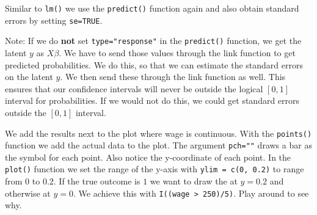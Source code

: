 \documentclass[]{article}
\newenvironment{Shaded}{\begin{snugshade}}{\end{snugshade}}
\newcommand{\CommentTok}[1]{\textcolor[rgb]{0.56,0.35,0.01}{\textit{#1}}}
\newcommand{\DataTypeTok}[1]{\textcolor[rgb]{0.13,0.29,0.53}{#1}}
\newcommand{\DecValTok}[1]{\textcolor[rgb]{0.00,0.00,0.81}{#1}}
\newcommand{\KeywordTok}[1]{\textcolor[rgb]{0.13,0.29,0.53}{\textbf{#1}}}
\newcommand{\NormalTok}[1]{#1}
\newcommand{\OperatorTok}[1]{\textcolor[rgb]{0.81,0.36,0.00}{\textbf{#1}}}
\newcommand{\OtherTok}[1]{\textcolor[rgb]{0.56,0.35,0.01}{#1}}
\newcommand{\StringTok}[1]{\textcolor[rgb]{0.31,0.60,0.02}{#1}}
\begin{document}
Similar to \texttt{lm()} we use the \texttt{predict()} function again and also obtain standard errors by setting \texttt{se=TRUE}.

Note: If we do \textbf{not} set \texttt{type="response"} in the \texttt{predict()} function, we get the latent \(y\) as \(X\beta\). We have to send those values through the link function to get predicted probabilities. We do this, so that we can estimate the standard errors on the latent \(y\). We then send these through the link function as well. This ensures that our confidence intervals will never be outside the logical \([0, 1]\) interval for probabilities. If we would not do this, we could get standard errors outside the \([0, 1]\) interval.

\begin{Shaded}
\end{Shaded}

We add the results next to the plot where wage is continuous. With the \texttt{points()} function we add the actual data to the plot. The argument \texttt{pch="\textbar{}"} draws a bar as the symbol for each point. Also notice the y-coordinate of each point. In the \texttt{plot()} function we set the range of the y-axis with \texttt{ylim\ =\ c(0,\ 0.2)} to range from \(0\) to \(0.2\). If the true outcome is \(1\) we want to draw the \textbar{} at \(y=0.2\) and otherwise at \(y=0\). We achieve this with \texttt{I((wage\ \textgreater{}\ 250)/5)}. Play around to see why.
\end{document}
